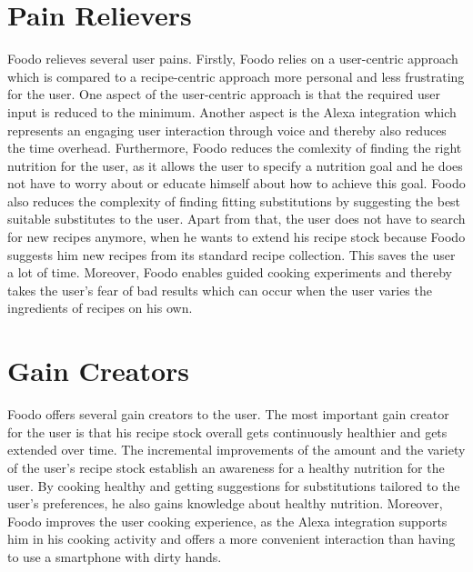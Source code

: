 \section{Pain Relievers}
Foodo relieves several user pains. Firstly, Foodo relies on a user-centric approach which is compared to a recipe-centric approach more personal and less frustrating for the user. One aspect of the user-centric approach is that the required user input is reduced to the minimum. Another aspect is the Alexa integration which represents an engaging user interaction through voice and thereby also reduces the time overhead. Furthermore, Foodo reduces the comlexity of finding the right nutrition for the user, as it allows the user to specify a nutrition goal and he does not have to worry about or educate himself about how to achieve this  goal. Foodo also reduces the complexity of finding fitting substitutions by suggesting the best suitable substitutes to the user. Apart from that, the user does not have to search for new recipes anymore, when he wants to extend his recipe stock because Foodo suggests him new recipes from its standard recipe collection. This saves the user a lot of time. Moreover, Foodo enables guided cooking experiments and thereby takes the user's fear of bad results which can occur when the user varies the ingredients of recipes on his own.


\section{Gain Creators}
Foodo offers several gain creators to the user. The most important gain creator for the user is that his recipe stock overall gets continuously healthier and gets extended over time. The incremental improvements of the amount and the variety of the user's recipe stock establish an awareness for a healthy nutrition for the user. By cooking healthy and getting suggestions for substitutions tailored to the user's preferences, he also gains knowledge about healthy nutrition. Moreover, Foodo improves the user cooking experience, as the Alexa integration supports him in his cooking activity and offers a more convenient interaction than having to use a smartphone with dirty hands.


